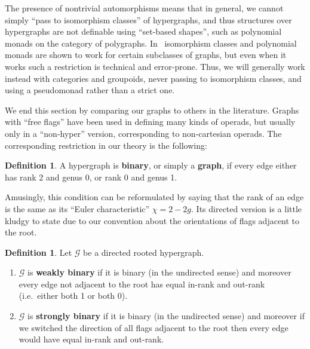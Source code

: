 \documentclass{article}
\theoremstyle{definition}
\newtheorem{defn}[thm]{Definition}
\theoremstyle{remark}
\def\G{\mathcal{G}}
\def\genus{\mathsf{genus}}
\def\rank{\mathsf{rank}}
\begin{document}
The presence of nontrivial automorphisms means that in general, we cannot simply ``pass to isomorphism classes'' of hypergraphs, and thus structures over hypergraphs are not definable using ``set-based shapes'', such as polynomial monads on the category of polygraphs.
In~\cite{bb:htapm} isomorphism classes and polynomial monads are shown to work for certain subclasses of graphs, but even when it works such a restriction is technical and error-prone.
Thus, we will generally work instead with categories and groupoids, never passing to isomorphism classes, and using a pseudomonad rather than a strict one.

We end this section by comparing our graphs to others in the literature.
Graphs with ``free flags'' have been used in defining many kinds of operads, but usually only in a ``non-hyper'' version, corresponding to non-cartesian operads.
The corresponding restriction in our theory is the following:

\begin{defn}
  A hypergraph is \textbf{binary}, or simply a \textbf{graph}, if %
  every edge either has rank 2 and genus 0, or rank 0 and genus 1.
\end{defn}

Amusingly, this condition can be reformulated by saying that the rank of an edge is the same as its ``Euler characteristic'' $\chi=2-2g$.
Its directed version is a little kludgy to state due to our convention about the orientations of flags adjacent to the root.

\begin{defn}
  Let $\G$ be a directed rooted hypergraph.
  \begin{enumerate}
  \item $\G$ is \textbf{weakly binary} if it is binary (in the undirected sense) and moreover every edge not adjacent to the root has equal in-rank and out-rank (i.e.\ either both 1 or both 0).
  \item $\G$ is \textbf{strongly binary} if it is binary (in the undirected sense) and moreover if we switched the direction of all flags adjacent to the root then every edge would have equal in-rank and out-rank.
  \end{enumerate}
\end{defn}
\end{document}
